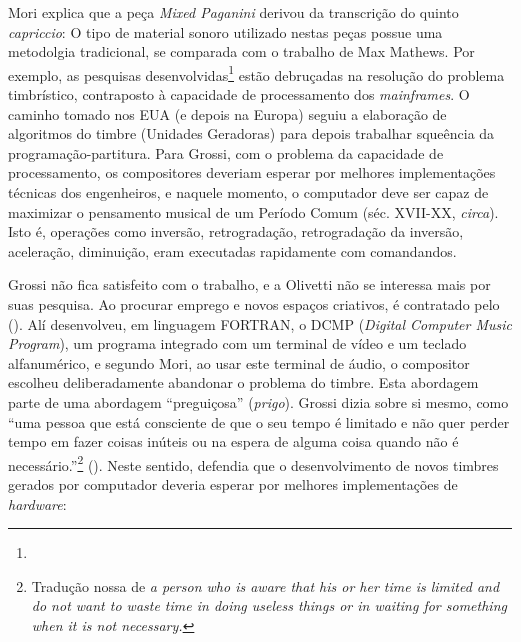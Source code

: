 Mori explica que a peça \emph{Mixed Paganini} derivou da transcrição do quinto \emph{capriccio}:  O tipo de material sonoro utilizado nestas peças possue uma metodolgia tradicional, se comparada com o trabalho de Max Mathews. Por exemplo, as pesquisas desenvolvidas\footnote{} estão debruçadas na resolução do problema timbrístico, contraposto à capacidade de processamento dos \emph{mainframes}. O caminho tomado nos EUA (e depois na Europa) seguiu a elaboração de algoritmos do timbre (Unidades Geradoras) para depois trabalhar squeência da programação-partitura. Para Grossi, com o problema da capacidade de processamento, os compositores deveriam esperar por melhores implementações técnicas dos engenheiros, e naquele momento, o computador deve ser capaz de maximizar o pensamento musical de um Período Comum (séc. XVII-XX, \emph{circa}). Isto é, operações como inversão, retrogradação, retrogradação da inversão, aceleração, diminuição, eram executadas rapidamente com comandandos. 

Grossi não fica satisfeito com o trabalho, e a Olivetti não se interessa mais por suas pesquisa. Ao procurar emprego e novos espaços criativos, é contratado pelo (\idemibdem). Alí desenvolveu, em linguagem FORTRAN, o DCMP (\emph{Digital Computer Music Program}), um programa integrado com um terminal de vídeo e um teclado alfanumérico, e segundo Mori, ao usar este terminal de áudio, o compositor escolheu deliberadamente abandonar o problema do timbre.  Esta abordagem parte de uma abordagem ``preguiçosa'' (\emph{prigo}). Grossi dizia sobre si mesmo, como ``uma pessoa que está consciente de que o seu tempo é limitado e não quer perder tempo em fazer coisas inúteis ou na espera de alguma coisa quando não é necessário.''\footnote{Tradução nossa de \emph{a person who is aware that his or her time is limited and do not want to waste time in doing useless things or in waiting for something when it is not necessary.}} (\idemibdem). Neste sentido, defendia que o desenvolvimento de novos timbres gerados por computador deveria esperar por melhores implementações de \emph{hardware}:

